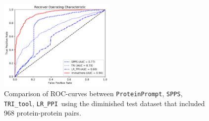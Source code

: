 \documentclass[preprint,3p,times,twocolumn]{elsarticle}
\newcommand{\spps}{\texttt{SPPS}}
\newcommand{\tri}{\texttt{TRI\_tool}}
\newcommand{\lr}{\texttt{LR\_PPI}}
\newcommand{\tool}{\texttt{ProteinPrompt}\hspace{2pt}}
\begin{document}
\begin{figure}
  \includegraphics[width=0.5\textwidth]{img/comparison_roc.pdf}
  \caption{Comparison of ROC-curves between \tool, \spps, \tri, \lr\ 
    using the diminished test dataset that included 968
    protein-protein pairs.}
  \label{fig:comparison}
\end{figure}

%
\end{document}
